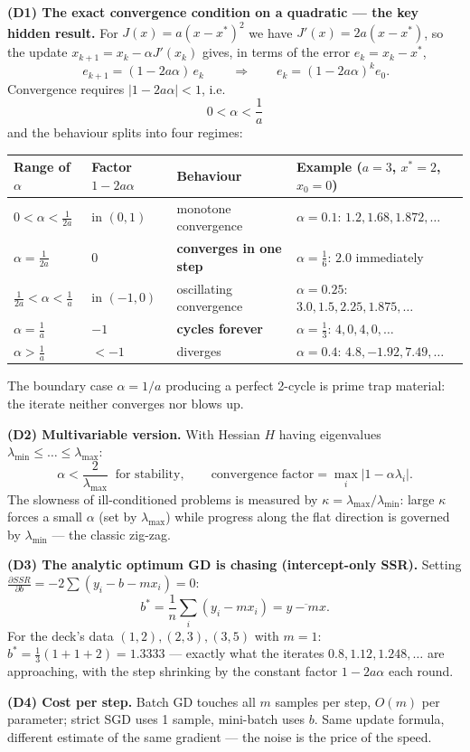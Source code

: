 \begin{derivedbox}
\textbf{(D1) The exact convergence condition on a quadratic --- the key hidden result.}
For $J(x) = a(x-x^\ast)^2$ we have $J'(x) = 2a(x-x^\ast)$, so the update $x_{k+1} = x_k - \alpha J'(x_k)$ gives, in terms of the error $e_k = x_k - x^\ast$,
\[
\boxed{\,e_{k+1} = (1-2a\alpha)\,e_k\,}\qquad\Longrightarrow\qquad e_k = (1-2a\alpha)^k e_0 .
\]
Convergence requires $|1-2a\alpha| < 1$, i.e.
\[
\boxed{\;0 < \alpha < \frac1a\;}
\]
and the behaviour splits into four regimes:
\begin{center}\small
\begin{tabular}{@{}llll@{}}
\toprule
Range of $\alpha$ & Factor $1-2a\alpha$ & Behaviour & Example ($a=3$, $x^\ast=2$, $x_0=0$)\\
\midrule
$0<\alpha<\frac{1}{2a}$ & in $(0,1)$ & monotone convergence & $\alpha=0.1$: $1.2, 1.68, 1.872,\dots$\\
$\alpha = \frac{1}{2a}$ & $0$ & \textbf{converges in one step} & $\alpha=\frac16$: $2.0$ immediately\\
$\frac{1}{2a}<\alpha<\frac1a$ & in $(-1,0)$ & oscillating convergence & $\alpha=0.25$: $3.0, 1.5, 2.25, 1.875,\dots$\\
$\alpha = \frac1a$ & $-1$ & \textbf{cycles forever} & $\alpha=\frac13$: $4,0,4,0,\dots$\\
$\alpha > \frac1a$ & $<-1$ & diverges & $\alpha=0.4$: $4.8, -1.92, 7.49,\dots$\\
\bottomrule
\end{tabular}
\end{center}
The boundary case $\alpha = 1/a$ producing a perfect 2-cycle is prime trap material: the iterate neither converges nor blows up.

\smallskip
\textbf{(D2) Multivariable version.} With Hessian $H$ having eigenvalues $\lambda_{\min}\le\dots\le\lambda_{\max}$:
\[
\alpha < \frac{2}{\lambda_{\max}}\ \text{ for stability}, \qquad
\text{convergence factor} = \max_i|1-\alpha\lambda_i| .
\]
The slowness of ill-conditioned problems is measured by $\kappa = \lambda_{\max}/\lambda_{\min}$: large $\kappa$ forces a small $\alpha$ (set by $\lambda_{\max}$) while progress along the flat direction is governed by $\lambda_{\min}$ --- the classic zig-zag.

\smallskip
\textbf{(D3) The analytic optimum GD is chasing (intercept-only SSR).} Setting $\frac{\partial SSR}{\partial b} = -2\sum(y_i-b-mx_i) = 0$:
\[
b^\ast = \frac1n\sum_i (y_i - m x_i) = \overline{y - mx}.
\]
For the deck's data $(1,2),(2,3),(3,5)$ with $m=1$: $b^\ast = \frac13(1+1+2) = 1.3333$ --- exactly what the iterates $0.8, 1.12, 1.248,\dots$ are approaching, with the step shrinking by the constant factor $1-2a\alpha$ each round.

\smallskip
\textbf{(D4) Cost per step.} Batch GD touches all $m$ samples per step, $O(m)$ per parameter; strict SGD uses 1 sample, mini-batch uses $b$. Same update formula, different estimate of the same gradient --- the noise is the price of the speed.
\end{derivedbox}

